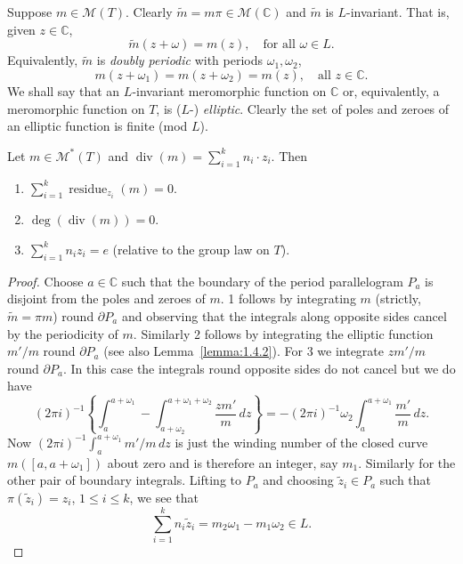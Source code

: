 Suppose $m\in\mathcal M(T)$. Clearly $\widetilde m=m\pi\in\mathcal M(\mathbb C)$ and $\widetilde m$ is $L$-invariant. That is, given $z\in\mathbb C$,
\[
\widetilde m(z+\omega)=m(z),\quad\text{for all }\omega\in L.
\]
Equivalently, $\widetilde m$ is \emph{doubly periodic} with periods $\omega_1,\omega_2$,
\[
m(z+\omega_1)=m(z+\omega_2)=m(z),\quad\text{all }z\in\mathbb C.
\]
We shall say that an $L$-invariant meromorphic function on $\mathbb C$ or, equivalently, a meromorphic function on $T$, is ($L$-) \emph{elliptic}. Clearly the set of poles and zeroes of an elliptic function is finite (mod $L$).

 Let $m\in\mathcal M^*(T)$ and $\operatorname{div}(m)=\sum_{i=1}^k n_i\cdot z_i$. Then
\begin{enumerate}
\item $\displaystyle\sum_{i=1}^k\operatorname{residue}_{z_i}(m)=0$.
\item $\deg(\operatorname{div}(m))=0$.
\item $\displaystyle\sum_{i=1}^k n_iz_i=e$ (relative to the group law on $T$).
\end{enumerate}
\begin{proof}
Choose $a\in\mathbb C$ such that the boundary of the period parallelogram $P_a$ is disjoint from the poles and zeroes of $m$. 1 follows by integrating $m$ (strictly, $\widetilde m=\pi m$) round $\partial P_a$ and observing that the integrals along opposite sides cancel by the periodicity of $m$. Similarly 2 follows by integrating the elliptic function $m'/m$ round $\partial P_a$ (see also Lemma~\ref{lemma:1.4.2}). For 3 we integrate $zm'/m$ round $\partial P_a$. In this case the integrals round
opposite sides do not cancel but we do have
\[
(2\pi i)^{-1}\left\{\int_a^{a+\omega_1}-\int_{a+\omega_2}^{a+\omega_1+\omega_2}\frac{zm'}m\,dz\right\}
=-(2\pi i)^{-1}\omega_2\int_a^{a+\omega_1}\frac{m'}m\,dz.
\]
Now $(2\pi i)^{-1}\int_a^{a+\omega_1}m'/m\,dz$ is just the winding number of the closed curve $m([a,a+\omega_1])$ about zero and is therefore an integer, say $m_1$. Similarly for the other pair of boundary integrals. Lifting to $P_a$ and choosing $\widetilde z_i\in P_a$ such that $\pi(\widetilde z_i)=z_i$, $1\leq i\leq k$, we see that
\[
\sum_{i=1}^k n_i\widetilde z_i=m_2\omega_1-m_1\omega_2\in L.
\]
\end{proof}

